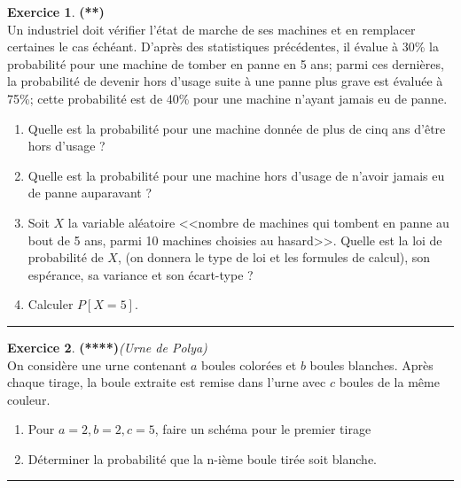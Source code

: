 \documentclass[a4paper,11pt]{article}
\theoremstyle{definition}
\newtheorem{exo}{Exercice} %
\begin{document}
\begin{exo}\textbf{(**)}\quad\\[0.25cm]%
	Un industriel doit vérifier l'état de marche de ses machines et en
	remplacer certaines le cas échéant. D'après des statistiques précédentes, 
	il évalue à 30\% la probabilité pour une
	machine de tomber en panne en 5 ans; parmi ces dernières, 
	la probabilité de devenir hors d'usage suite à une panne plus grave est 
	évaluée à 75\%; cette probabilité est de 40\% pour une machine
	n'ayant jamais eu de panne.
	\begin{enumerate}
		\item Quelle est la probabilité pour une machine donnée de plus de cinq
		ans d'être hors d'usage ?
		
		\item Quelle est la probabilité pour une machine hors d'usage de n'avoir
		jamais eu de panne auparavant ?
		
		\item Soit $X$ la variable aléatoire <<nombre de machines
		qui tombent en panne au bout de 5 ans, parmi 10 machines choisies au
		hasard>>. Quelle est la loi de probabilité de $X$, (on
		donnera le type de loi et les formules de calcul), son espérance, sa
		variance et son écart-type ?
		
		\item Calculer $P[X=5]$.
	\end{enumerate}
	
	\centering
	\rule{1\linewidth}{0.6pt}
\end{exo}



\begin{exo}\textbf{(****)}\quad\textit{(Urne de \sc Polya)}\\[0.2cm]
	
	On considère une urne contenant $a$ boules colorées et $b$ boules blanches. Après chaque tirage, la boule extraite est remise dans l'urne avec $c$ boules de la même couleur.
	\begin{enumerate}
		\item Pour $a=2, b=2, c=5$, faire un schéma pour le premier tirage
		\item Déterminer la probabilité que la n-ième boule tirée soit blanche.
	\end{enumerate}
	
	
	
	\centering\rule{1\linewidth}{0.6pt}\end{exo}
\end{document}
